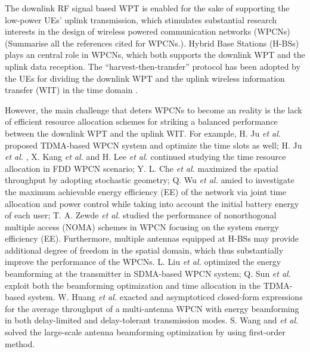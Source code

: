 \documentclass[12pt,draft,onecolumn,journal]{IEEEtran}
\begin{document}
The downlink RF signal based WPT is enabled for the sake of supporting the low-power UEs' uplink transmission, which stimulates substantial research interests in the design of wireless powered communication networks (WPCNs) \cite{wpcn_1,wpcn_2,wpcn_3,wpcn_4,wpcn_5,wpcn_6,wpcn_7,wpcn_8,wpcn_9,wpcn_10,wpcn_11} {\color{red} (Summarise all the references cited for WPCNs.)}. Hybrid Base Stations (H-BSs) plays an central role in WPCNs, which both supports the downlink WPT and the uplink data reception. The ``harvest-then-transfer'' protocol has been adopted by the UEs for dividing the downlink WPT and the uplink wireless information transfer (WIT) in the time domain \cite{wpcn_1}.

However, the main challenge that deters WPCNs to become an reality is the lack of efficient resource allocation schemes for striking a balanced performance between the downlink WPT and the uplink WIT. For example, H. Ju \textit{et al.} \cite{wpcn_1} proposed TDMA-based WPCN system and optimize the time slots as well; H. Ju \textit{et al.} \cite{wpcn_2}, X. Kang \textit{et al.} \cite{wpcn_4} and H. Lee \textit{et al.} \cite{wpcn_8} continued studying the time resource allocation in FDD WPCN scenario; Y. L. Che \textit{et al.} \cite{wpcn_3} maximized the spatial throughput by adopting stochastic geometry;  Q. Wu \textit{et al.} \cite{wpcn_6} amied to investigate the maximum achievable energy efficiency (EE) of the network via joint time allocation and power control while taking into account the initial battery energy of each user; T. A. Zewde \textit{et al.} \cite{wpcn_10} studied the performance of nonorthogonal multiple access (NOMA) schemes in WPCN focusing on the system energy efficiency (EE). Furthermore, multiple antennas equipped at H-BSs may provide additional degree of freedom in the spatial domain, which thus substantially improve the performance of the WPCNs. L. Liu \textit{et al.} \cite{wpcn_5} optimized the energy beamforming at the transmitter in SDMA-based WPCN system; Q. Sun \textit{et al.} \cite{wpcn_7} exploit both the beamforming optimization and time allocation in the TDMA-based system. W. Huang \textit{et al.} \cite{wpcn_9} exacted and asymptoticed closed-form expressions for the average throughput of a multi-antenna WPCN with energy beamforming in both delay-limited and delay-tolerant transmission modes. S. Wang and \textit{et al.} \cite{wpcn_11} solved the large-scale antenna beamforming optimization by using first-order method.
\end{document}
